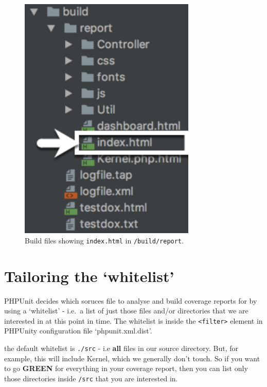 \documentclass[a4paperpaper,openright]{book}
\begin{document}
\begin{figure}
\centering
\includegraphics[width=0.75\textwidth,height=\textheight]{./tex2pdf.-5a4428120ede4be1/6d9bd18e008151ecb77d2f17729d4c6cfe5c431e.png}
\caption{Build files showing \texttt{index.html} in
\texttt{/build/report}. \label{build_files}}
\end{figure}

\hypertarget{tailoring-the-whitelist}{%
\section{Tailoring the `whitelist'}\label{tailoring-the-whitelist}}

PHPUnit decides which soruces file to analyse and build coverage reports
for by using a `whitelist' - i.e.~a list of just those files and/or
directories that we are interested in at this point in time. The
whitelist is inside the \texttt{\textless{}filter\textgreater{}} element
in PHPUnity configuration file `phpunit.xml.dist'.

the default whitelist is \texttt{./src} - i.e \textbf{all} files in our
source directory. But, for example, this will include Kernel, which we
generally don't touch. So if you want to go \textbf{GREEN} for
everything in your coverage report, then you can list only those
directories inside \texttt{/src} that you are interested in.
\end{document}
